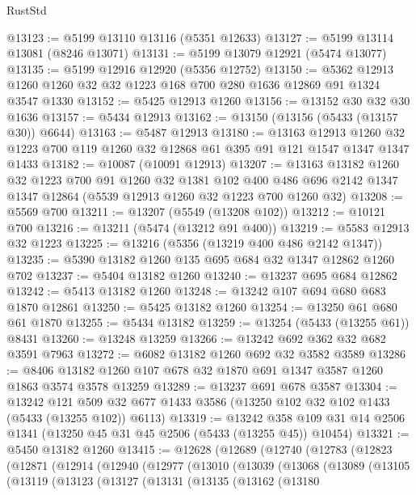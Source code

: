 \begin{lexlean}{RustStd}
\begin{coremodule}
@13123 := @5199 @13110 @13116 (@5351 @12633)
@13127 := @5199 @13114 @13081 (@8246 @13071)
@13131 := @5199 @13079 @12921 (@5474 @13077)
@13135 := @5199 @12916 @12920 (@5356 @12752)
@13150 := @5362 @12913 @1260 @1260 @32 @32 @1223 @168 @700 @280 @1636 @12869 @91 @1324 @3547 @1330
@13152 := @5425 @12913 @1260
@13156 := @13152 @30 @32 @30 @1636
@13157 := @5434 @12913
@13162 := @13150 (@13156 (@5433 (@13157 @30)) @6644)
@13163 := @5487 @12913
@13180 := @13163
    @12913
    @1260
    @32
    @1223
    @700
    @119
    @1260
    @32
    @12868
    @61
    @395
    @91
    @121
    @1547
    @1347
    @1347
    @1433
@13182 := @10087 (@10091 @12913)
@13207 := @13163
    @13182
    @1260
    @32
    @1223
    @700
    @91
    @1260
    @32
    @1381
    @102
    @400
    @486
    @696
    @2142
    @1347
    @1347
    @12864
    (@5539 @12913 @1260 @32 @1223 @700 @1260 @32)
@13208 := @5569 @700
@13211 := @13207 (@5549 (@13208 @102))
@13212 := @10121 @700
@13216 := @13211 (@5474 (@13212 @91 @400))
@13219 := @5583 @12913 @32 @1223
@13225 := @13216 (@5356 (@13219 @400 @486 @2142 @1347))
@13235 := @5390 @13182 @1260 @135 @695 @684 @32 @1347 @12862 @1260 @702
@13237 := @5404 @13182 @1260
@13240 := @13237 @695 @684 @12862
@13242 := @5413 @13182 @1260
@13248 := @13242 @107 @694 @680 @683 @1870 @12861
@13250 := @5425 @13182 @1260
@13254 := @13250 @61 @680 @61 @1870
@13255 := @5434 @13182
@13259 := @13254 (@5433 (@13255 @61)) @8431
@13260 := @13248 @13259
@13266 := @13242 @692 @362 @32 @682 @3591 @7963
@13272 := @6082 @13182 @1260 @692 @32 @3582 @3589
@13286 := @8406 @13182 @1260 @107 @678 @32 @1870 @691 @1347 @3587 @1260 @1863 @3574 @3578 @13259
@13289 := @13237 @691 @678 @3587
@13304 := @13242
    @121
    @509
    @32
    @677
    @1433
    @3586
    (@13250 @102 @32 @102 @1433 (@5433 (@13255 @102)) @6113)
@13319 := @13242
    @358
    @109
    @31
    @14
    @2506
    @1341
    (@13250 @45 @31 @45 @2506 (@5433 (@13255 @45)) @10454)
@13321 := @5450 @13182 @1260
@13415 := @12628
    (@12689
      (@12740
        (@12783
          (@12823
            (@12871
              (@12914
                (@12940
                  (@12977
                    (@13010
                      (@13039
                        (@13068
                          (@13089
                            (@13105
                              (@13119
                                (@13123
                                  (@13127
                                    (@13131
                                      (@13135
                                        (@13162
                                          (@13180

\end{coremodule}
\end{lexlean}
